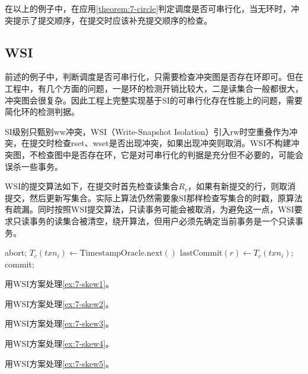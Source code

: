 在以上的例子中，在应用\theoremname\ref{theorem:7-circle}判定调度是否可串行化，当无环时，冲突提示了提交顺序，在提交时应该补充提交顺序的检查。

\subsection{WSI}

前述的例子中，判断调度是否可串行化，只需要检查冲突图是否存在环即可。但在工程中，有几个方面的问题，一是环的检测开销比较大，二是读集合一般都很大，冲突图会很复杂。因此工程上完整实现基于SI的可串行化存在性能上的问题，需要简化环的检测判据。

SI级别只甄别ww冲突，WSI（Write-Snapshot Isolation）\cite{cahill2009serializable}引入rw时空重叠作为冲突，在提交时检查rset、wset是否出现冲突，如果出现冲突则取消。WSI不构建冲突图，不检查图中是否存在环，它是对可串行化的判据是充分但不必要的，可能会误杀一些事务。

WSI的提交算法如下，在提交时首先检查读集合$R_r$，如果有新提交的行，则取消提交，然后更新写集合。实际上算法仍然需要象SI那样检查写集合的时戳，原算法有疏漏。同时按照WSI提交算法，只读事务可能会被取消，为避免这一点，WSI要求只读事务的读集合被清空，绕开算法，但用户必须先确定当前事务是一个只读事务。

\begin{algorithm}[H]\label{alg:wsi}
    \caption{WSI Commit ($T_s(txn_i), R_w, R_r$): \{commit, abort\}}
    \begin{algorithmic}
                \State\Return abort;
            \EndIf
        \EndFor
        \State {}
        \State $T_c(txn_i) \gets \mathrm{TimestampOracle.next()}$
            \State $\mathrm{lastCommit}(r) \gets T_c(txn_i)$;
        \EndFor
        \State\Return commit;
    \end{algorithmic}
\end{algorithm}

\begin{exercise}
    用WSI方案处理\examplename\ref{ex:7-skew1}。
\end{exercise}
\begin{exercise}
    用WSI方案处理\examplename\ref{ex:7-skew2}。
\end{exercise}
\begin{exercise}
    用WSI方案处理\examplename\ref{ex:7-skew3}。
\end{exercise}
\begin{exercise}
    用WSI方案处理\examplename\ref{ex:7-skew4}。
\end{exercise}
\begin{exercise}
    用WSI方案处理\examplename\ref{ex:7-skew5}。
\end{exercise}

